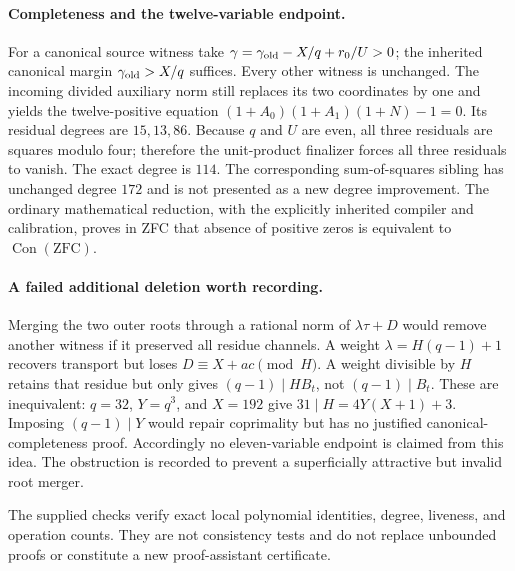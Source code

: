 \paragraph{Completeness and the twelve-variable endpoint.}
For a canonical source witness take
$\gamma=\gamma_{\rm old}-X/q+r_0/U>0$; the inherited canonical margin
$\gamma_{\rm old}>X/q$ suffices.  Every other witness is unchanged.
The incoming divided auxiliary norm still replaces its two coordinates by
one and yields the twelve-positive equation
$(1+A_0)(1+A_1)(1+N)-1=0$.  Its residual degrees are $15,13,86$.
Because $q$ and $U$ are even, all three residuals are squares modulo four;
therefore the unit-product finalizer forces all three residuals to vanish.
The exact degree is $114$.  The corresponding sum-of-squares sibling has
unchanged degree $172$ and is not presented as a new degree improvement.
The ordinary mathematical reduction, with the explicitly inherited compiler
and calibration, proves in ZFC that absence of positive zeros is equivalent
to $\operatorname{Con}(\mathrm{ZFC})$.

\paragraph{A failed additional deletion worth recording.}
Merging the two outer roots through a rational norm of $\lambda\tau+D$
would remove another witness if it preserved all residue channels.
A weight $\lambda=H(q-1)+1$ recovers transport but loses
$D\equiv X+ac\pmod H$.  A weight divisible by $H$ retains that residue but
only gives $(q-1)\mid H B_t$, not $(q-1)\mid B_t$.
These are inequivalent: $q=32$, $Y=q^3$, and $X=192$ give
$31\mid H=4Y(X+1)+3$.  Imposing $(q-1)\mid Y$ would repair coprimality but
has no justified canonical-completeness proof.  Accordingly no eleven-variable
endpoint is claimed from this idea.  The obstruction is recorded to prevent a
superficially attractive but invalid root merger.

The supplied checks verify exact local polynomial identities, degree,
liveness, and operation counts.  They are not consistency tests and do not
replace unbounded proofs or constitute a new proof-assistant certificate.
